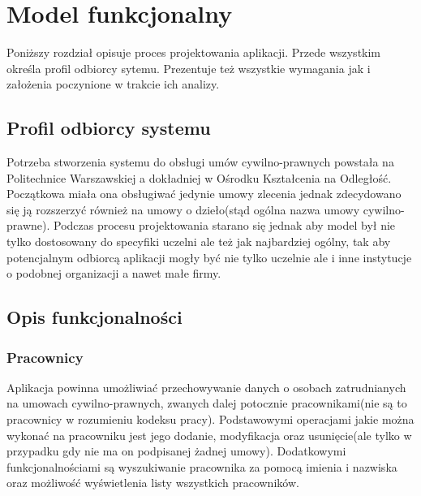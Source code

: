 \chapter{Model funkcjonalny}
Poniższy rozdział opisuje proces projektowania aplikacji. Przede wszystkim określa profil odbiorcy sytemu. Prezentuje też wszystkie wymagania jak i założenia poczynione w trakcie ich analizy.

\section[Profil odbiorcy systemu][Profil odbiorcy systemu]{Profil odbiorcy systemu}
Potrzeba stworzenia systemu do obsługi umów cywilno-prawnych powstała na Politechnice Warszawskiej a dokładniej w Ośrodku Kształcenia na Odległość. Początkowa miała ona obsługiwać jedynie umowy zlecenia jednak zdecydowano się ją rozszerzyć również na umowy o dzieło(stąd ogólna nazwa umowy cywilno-prawne). Podczas procesu projektowania starano się jednak aby model był nie tylko dostosowany do specyfiki uczelni ale też jak najbardziej ogólny, tak aby potencjalnym odbiorcą aplikacji mogły być nie tylko uczelnie ale i inne instytucje o podobnej organizacji a nawet małe firmy.

\section[Opis funkcjonalności][Opis funkcjonalności]{Opis funkcjonalności}

\subsection[Pracownicy][Pracownicy]{Pracownicy}
\label{pracownicy}
Aplikacja powinna umożliwiać przechowywanie danych o osobach zatrudnianych na umowach cywilno-prawnych, zwanych dalej potocznie pracownikami(nie są to pracownicy w rozumieniu kodeksu pracy). Podstawowymi operacjami jakie można wykonać na pracowniku jest jego dodanie, modyfikacja oraz usunięcie(ale tylko w przypadku gdy nie ma on podpisanej żadnej umowy). Dodatkowymi funkcjonalnościami są wyszukiwanie pracownika za pomocą imienia i nazwiska oraz możliwość wyświetlenia listy wszystkich pracowników.


